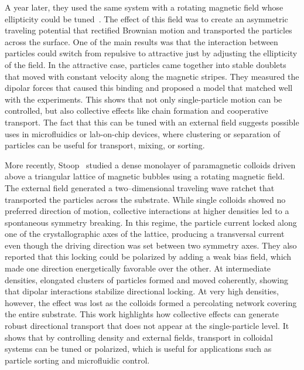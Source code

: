 A year later, they used the same system with a rotating magnetic field whose ellipticity could be tuned~\cite{straube2014tunable}. The effect of this field was to create an asymmetric traveling potential that rectified Brownian motion and transported the particles across the surface.
One of the main results was that the interaction between particles could switch from repulsive to attractive just by adjusting the ellipticity of the field. In the attractive case, particles came together into stable doublets that moved with constant velocity along the magnetic stripes. They measured the dipolar forces that caused this binding and proposed a model that matched well with the experiments.
This shows that not only single-particle motion can be controlled, but also collective effects like chain formation and cooperative transport. The fact that this can be tuned with an external field suggests possible uses in microfluidics or lab-on-chip devices, where clustering or separation of particles can be useful for transport, mixing, or sorting.

More recently, Stoop~\cite{stoop2020collective} studied a dense monolayer of paramagnetic colloids driven above a triangular lattice of magnetic bubbles using a rotating magnetic field. The external field generated a two–dimensional traveling wave ratchet that transported the particles across the substrate. While single colloids showed no preferred direction of motion, collective interactions at higher densities led to a spontaneous symmetry breaking. In this regime, the particle current locked along one of the crystallographic axes of the lattice, producing a transversal current even though the driving direction was set between two symmetry axes.
They also reported that this locking could be polarized by adding a weak bias field, which made one direction energetically favorable over the other. At intermediate densities, elongated clusters of particles formed and moved coherently, showing that dipolar interactions stabilize directional locking. At very high densities, however, the effect was lost as the colloids formed a percolating network covering the entire substrate.
This work highlights how collective effects can generate robust directional transport that does not appear at the single-particle level. It shows that by controlling density and external fields, transport in colloidal systems can be tuned or polarized, which is useful for applications such as particle sorting and microfluidic control. 

